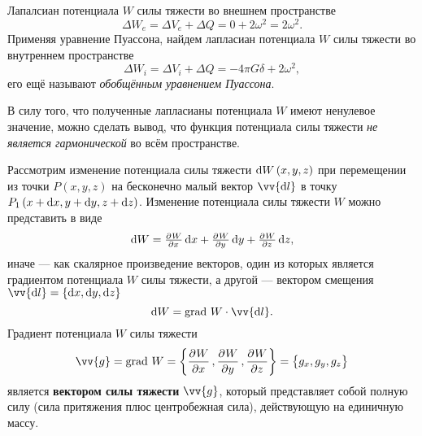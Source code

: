 \documentclass[11pt, a4paper]{article}
\theoremstyle{plain}
\theoremstyle{definition}
\theoremstyle{remark}
\begin{document}
Лапалсиан потенциала $W$ силы тяжести во внешнем пространстве
\begin{equation*}
	\Delta W_e = \Delta V_e + \Delta Q = 0 + 2 \omega^2 = 2 \omega^2.
\end{equation*}
Применяя уравнение Пуассона, найдем лапласиан потенциала $W$ силы тяжести  во внутреннем пространстве
\begin{equation*}
	\Delta W_i = \Delta V_i + \Delta Q = -4 \pi G \delta + 2 \omega^2,
\end{equation*}
его ещё называют \textit{обобщённым уравнением Пуассона}.

В силу того, что полученные лапласианы потенциала $W$ имеют ненулевое значение, можно сделать вывод, что функция потенциала силы тяжести \textit{не является гармонической} во всём пространстве.

Рассмотрим изменение потенциала силы тяжести $\dif W \left(x, y, z\right)$ при перемещении из точки $P\left( x, y,z \right)$ на бесконечно малый вектор $\vv{\dif l}$ в точку $P_1\left( x + \dif x, y + \dif y, z + \dif z \right)$.
Изменение потенциала силы тяжести $W$ можно представить в виде
\begin{equation*}
    \dif W = \pd{W}{x}\dif x + \pd{W}{y}\dif y + \pd{W}{z}\dif z, 
\end{equation*}
иначе --- как скалярное произведение векторов, один из которых является градиентом потенциала $W$ силы тяжести, а другой --- вектором смещения $\vv{\dif l} = \left\lbrace \dif x, \dif y, \dif z \right\rbrace$
\begin{equation}
	\dif W = \text{grad } W \cdot \vv{\dif l}.
\end{equation}
Градиент потенциала $W$ силы тяжести
\begin{equation}
	\vv{g} = \text{grad } W = \left\lbrace \dpd{W}{x}, \dpd{W}{y}, \dpd{W}{z} \right\rbrace = \left\lbrace g_x, g_y, g_z \right\rbrace
\end{equation}
является \textbf{вектором силы тяжести} $\vv{g}$, который представляет собой полную силу (сила притяжения плюс центробежная сила), действующую на единичную массу.
\end{document}
